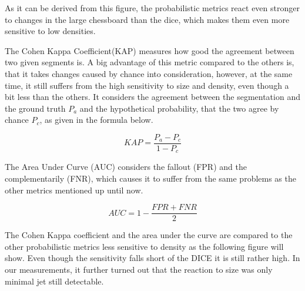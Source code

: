 \documentclass[journal]{IEEEtran}
\begin{document}
As it can be derived from this figure, the probabilistic metrics react even stronger to changes in the large chessboard than the dice, which makes them even more sensitive to low densities.

\hspace{2in}

The Cohen Kappa Coefficient(KAP) measures how good the agreement between two given segments is. A big advantage of this metric compared to the others is, that it takes changes caused by chance into consideration, however, at the same time, it still suffers from the high sensitivity to size and density, even though a bit less than the others. It considers the agreement between the segmentation and the ground truth $P_a$ and the hypothetical probability, that the two agree by chance $P_c$, as given in the formula below.

\begin{equation} %
	KAP = \frac{P_a - P_c}{1 - P_c}
\end{equation}

The Area Under Curve (AUC) considers the fallout (FPR) and the complementarily (FNR), which causes it to suffer from the same problems as the other metrics mentioned up until now. 

\begin{equation} %
	AUC = 1 - \frac{FPR + FNR}{2}
\end{equation}

The Cohen Kappa coefficient and the area under the curve are compared to the other probabilistic metrics less sensitive to density as the following figure will show. Even though the sensitivity falls short of the DICE it is still rather high. In our measurements, it further turned out that the reaction to size was only minimal jet still detectable.

\end{document}
